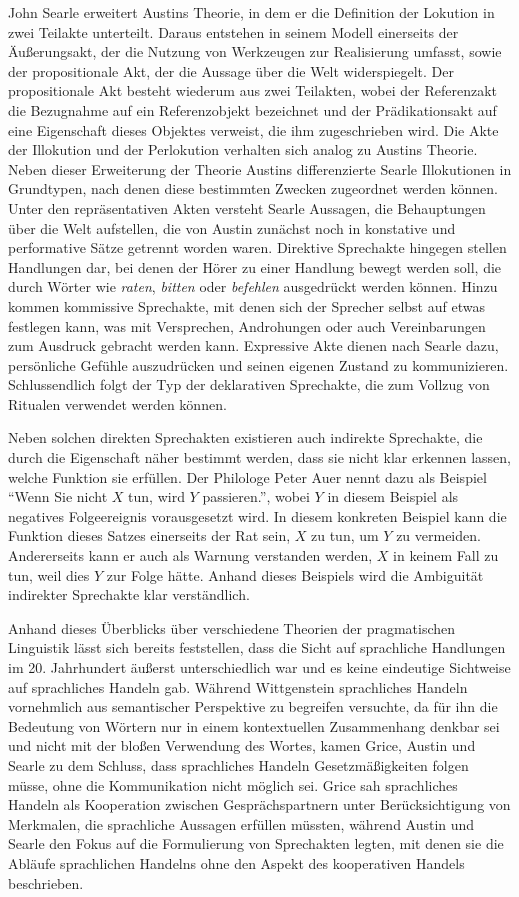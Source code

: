 John Searle erweitert Austins Theorie, in dem er die Definition der Lokution in zwei Teilakte unterteilt.
Daraus entstehen in seinem Modell einerseits der Äußerungsakt, der die Nutzung von Werkzeugen zur Realisierung umfasst, sowie der propositionale Akt, der die Aussage über die Welt widerspiegelt.
Der propositionale Akt besteht wiederum aus zwei Teilakten, wobei der Referenzakt die Bezugnahme auf ein Referenzobjekt bezeichnet und der Prädikationsakt auf eine Eigenschaft dieses Objektes verweist, die ihm zugeschrieben wird.
Die Akte der Illokution und der Perlokution verhalten sich analog zu Austins Theorie.
Neben dieser Erweiterung der Theorie Austins differenzierte Searle Illokutionen in Grundtypen, nach denen diese bestimmten Zwecken zugeordnet werden können.
Unter den repräsentativen Akten versteht Searle Aussagen, die Behauptungen über die Welt aufstellen, die von Austin zunächst noch in konstative und performative Sätze getrennt worden waren.
Direktive Sprechakte hingegen stellen Handlungen dar, bei denen der Hörer zu einer Handlung bewegt werden soll, die durch Wörter wie \emph{raten}, \emph{bitten} oder \emph{befehlen} ausgedrückt werden können.
Hinzu kommen kommissive Sprechakte, mit denen sich der Sprecher selbst auf etwas festlegen kann, was mit Versprechen, Androhungen oder auch Vereinbarungen zum Ausdruck gebracht werden kann.
Expressive Akte dienen nach Searle dazu, persönliche Gefühle auszudrücken und seinen eigenen Zustand zu kommunizieren.
Schlussendlich folgt der Typ der deklarativen Sprechakte, die zum Vollzug von Ritualen verwendet werden können.

Neben solchen direkten Sprechakten existieren auch indirekte Sprechakte, die durch die Eigenschaft näher bestimmt werden, dass sie nicht klar erkennen lassen, welche Funktion sie erfüllen.
Der Philologe Peter Auer nennt dazu als Beispiel "`Wenn Sie nicht $X$ tun, wird $Y$ passieren."', wobei $Y$ in diesem Beispiel als negatives Folgeereignis vorausgesetzt wird.
In diesem konkreten Beispiel kann die Funktion dieses Satzes einerseits der Rat sein, $X$ zu tun, um $Y$ zu vermeiden.
Andererseits kann er auch als Warnung verstanden werden, $X$ in keinem Fall zu tun, weil dies $Y$ zur Folge hätte.
Anhand dieses Beispiels wird die Ambiguität indirekter Sprechakte klar verständlich.

Anhand dieses Überblicks über verschiedene Theorien der pragmatischen Linguistik lässt sich bereits feststellen, dass die Sicht auf sprachliche Handlungen im 20. Jahrhundert äußerst
unterschiedlich war und es keine eindeutige Sichtweise auf sprachliches Handeln gab.
Während Wittgenstein sprachliches Handeln vornehmlich aus semantischer Perspektive zu begreifen versuchte, da für ihn die Bedeutung von Wörtern nur in einem kontextuellen Zusammenhang denkbar sei und nicht mit der bloßen Verwendung des Wortes, kamen Grice, Austin und Searle zu dem Schluss, dass sprachliches Handeln Gesetzmäßigkeiten folgen müsse, ohne die Kommunikation nicht möglich sei.
Grice sah sprachliches Handeln als Kooperation zwischen Gesprächspartnern unter Berücksichtigung von Merkmalen, die sprachliche Aussagen erfüllen müssten, während Austin und Searle den Fokus auf die Formulierung von Sprechakten legten, mit denen sie die Abläufe sprachlichen Handelns ohne den Aspekt des kooperativen Handels beschrieben.

